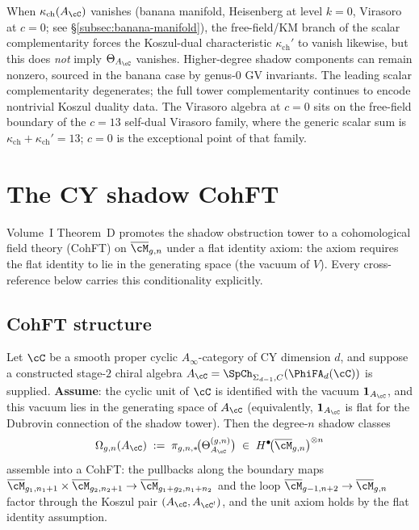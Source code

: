 \begin{remark}
\label{rem:cy-complementarity-kappa-zero}
When $\kappa_{\mathrm{ch}}(A_\cC)$ vanishes (banana manifold, Heisenberg at level $k = 0$, Virasoro at $c = 0$; see \S\ref{subsec:banana-manifold}), the free-field/KM branch of the scalar complementarity forces the Koszul-dual characteristic $\kappa_{\mathrm{ch}}'$ to vanish likewise, but this does \emph{not} imply $\Theta_{A_\cC}$ vanishes. Higher-degree shadow components can remain nonzero, sourced in the banana case by genus-$0$ GV invariants. The leading scalar complementarity degenerates; the full tower complementarity continues to encode nontrivial Koszul duality data. The Virasoro algebra at $c=0$ sits on the free-field boundary of the $c = 13$ self-dual Virasoro family, where the generic scalar sum is $\kappa_{\mathrm{ch}} + \kappa_{\mathrm{ch}}' = 13$; $c = 0$ is the exceptional point of that family.
\end{remark}



\section{The CY shadow CohFT}
\label{sec:cy-shadow-cohft}

Volume~I Theorem~D promotes the shadow obstruction tower to a cohomological field theory (CohFT) on $\overline{\cM}_{g,n}$ under a flat identity axiom: the axiom requires the flat identity to lie in the generating space (the vacuum of $V$). Every cross-reference below carries this conditionality explicitly.

\subsection{CohFT structure}

\begin{theorem}
\label{thm:cy-shadow-cohft}
Let $\cC$ be a smooth proper cyclic $A_\infty$-category of CY dimension
$d$, and suppose a constructed stage-$2$ chiral algebra
$A_\cC=\SpCh_{\Sigma_{d-1},C}(\PhiFA_d(\cC))$ is supplied. \textbf{Assume}:
the cyclic unit of $\cC$ is identified with the vacuum
$\mathbf{1}_{A_\cC}$, and this vacuum lies in the generating space of
$A_\cC$ (equivalently, $\mathbf{1}_{A_\cC}$ is flat for the Dubrovin
connection of the shadow tower). Then the degree-$n$ shadow classes
\[
 \Omega_{g,n}(A_\cC) \;:=\; \pi_{g,n,*}\!\bigl(\Theta_{A_\cC}^{(g,n)}\bigr) \;\in\; H^\bullet\!\bigl(\overline{\cM}_{g,n}\bigr)^{\otimes n}
\]
assemble into a CohFT: the pullbacks along the boundary maps $\overline{\cM}_{g_1, n_1 + 1} \times \overline{\cM}_{g_2, n_2 + 1} \to \overline{\cM}_{g_1 + g_2, n_1 + n_2}$ and the loop $\overline{\cM}_{g - 1, n + 2} \to \overline{\cM}_{g, n}$ factor through the Koszul pair $(A_\cC, A_{\cC^!})$, and the unit axiom holds by the flat identity assumption.
\end{theorem}

